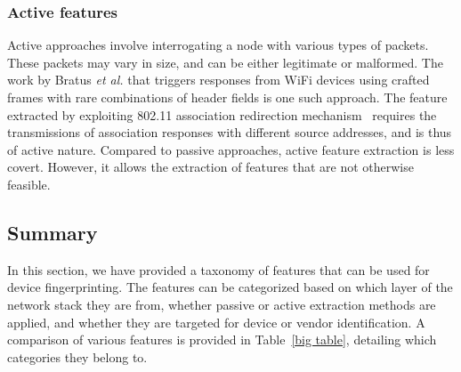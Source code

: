 \documentclass[journal,draftcls,onecolumn,11pt]{IEEEtran}
\begin{document}
\subsubsection{Active features}

Active approaches involve interrogating a node with various types of packets. These packets may vary in size, and can be either legitimate or malformed. The work by Bratus {\it et al.} that triggers responses from WiFi devices using crafted frames with rare combinations of header fields is one such approach. The feature extracted by exploiting 802.11 association redirection mechanism~\cite{Cache} requires the transmissions of association responses with different source addresses, and is thus of active nature. Compared to passive approaches, active feature extraction is less covert.  However, it allows the extraction of features that are not otherwise feasible.

\subsection{Summary}

In this section, we have provided a taxonomy of features that can be used for device fingerprinting. The features can be categorized based on which layer of the network stack they are from, whether passive or active extraction methods are applied, and whether they are targeted for device or vendor identification.  A comparison of various features is provided in Table~\ref{big table}, detailing which categories they belong to.
\end{document}
